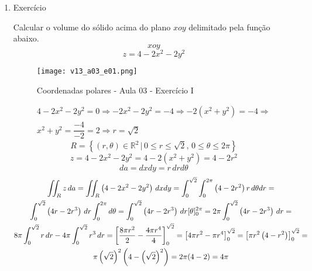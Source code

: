 \begin{enumerate}
	\item Exercício
	
	Calcular o volume do sólido acima do plano $xoy$ delimitado pela função abaixo.
	\begin{equation*}
		xoy
	\end{equation*}
	\begin{equation*}
		z = 4 - 2x^2 - 2y^2
	\end{equation*}
	
	\begin{figure}[htb]
		\caption{Coordenadas polares - Aula 03 - Exercício I}
		\label{v13_a03_e01}
		\centering
		\texttt{[image: v13\_a03\_e01.png]}		
	\end{figure}
	
	\begin{gather*}
		4 - 2x^2 - 2y^2 = 0 \Rightarrow -2x^2 - 2y^2 = - 4 \Rightarrow - 2\left(x^2 + y^2\right) = -4 \Rightarrow\\ x^2 + y^2 = \dfrac{-4}{-2} = 2 \Rightarrow r = \sqrt{2}
	\end{gather*}
	\begin{equation*}
		R = \left\{(r, \theta) \in \mathbb{R}^2 \,|\, 0 \leq r \leq \sqrt{2},\, 0 \leq \theta \leq 2\pi\right\}
	\end{equation*}
	\begin{equation*}
		z = 4 - 2x^2 - 2y^2 = 4 - 2\left(x^2 + y^2\right) = 4 - 2r^2
	\end{equation*}
	\begin{equation*}
		da = dxdy = r\, drd\theta
	\end{equation*}
	\begin{gather*}
		\iint_R z\, da = \iint_R \left(4 - 2x^2 - 2y^2\right)\, dxdy = \int_0^{\sqrt{2}} \int_0^{2\pi} \left(4 - 2r^2\right) r\,d\theta dr =\\ \int_0^{\sqrt{2}} \left(4r - 2r^3\right) \, dr \int_0^{2\pi} d\theta = \int_0^{\sqrt{2}} \left(4r - 2r^3\right) \, dr [\theta]_0^{2\pi} = 2\pi\int_0^{\sqrt{2}} \left(4r - 2r^3\right) \, dr =\\ 8\pi\int_0^{\sqrt{2}} r\, dr - 4\pi\int_0^{\sqrt{2}} r^3\, dr = \left[\dfrac{8\pi r^2}{2} - \dfrac{\overstrike{4}\pi r^4}{\overstrike{4}}\right]_0^{\sqrt{2}} = \left[4\pi r^2 - \pi r^4\right]_0^{\sqrt{2}} = \left[\pi r^2\left(4 - r^2\right)\right]_0^{\sqrt{2}} =\\ \pi \left(\sqrt{2}\right)^2\left(4 - \left(\sqrt{2}\right)^2\right) = 2\pi(4 - 2) = 4\pi
	\end{gather*}
\end{enumerate}